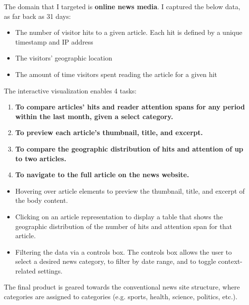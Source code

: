 \documentclass[12pt]{article}
\begin{document}
The domain that I targeted is \textbf{online news media}. I captured the below data, as far back as 31 days:
\begin{itemize}
\item The number of visitor hits to a given article. Each hit is defined by a unique timestamp and IP address
\item The visitors' geographic location
\item The amount of time visitors spent reading the article for a given hit
\end{itemize}

\newpage

\noindent The interactive visualization enables 4 tasks:
\begin{enumerate}
\item \textbf{To compare articles' hits and reader attention spans for any period within the last month, given a select category.}
\item \textbf{To preview each article's thumbnail, title, and excerpt.}
\item \textbf{To compare the geographic distribution of hits and attention of up to two articles.}
\item \textbf{To navigate to the full article on the news website.}
\end{enumerate}

\begin{itemize}
\item Hovering over article elements to preview the thumbnail, title, and excerpt of the body content.
\item Clicking on an article representation to display a table that shows the geographic distribution of the number of hits and attention span for that article.
\item Filtering the data via a controls box. The controls box allows the user to select a desired news category, to filter by date range, and to toggle context-related settings. 
\end{itemize}

The final product is geared towards the conventional news site structure, where categories are assigned to categories (e.g. sports, health, science, politics, etc.). \\
\end{document}
